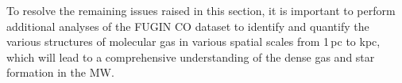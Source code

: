 \documentclass[proof]{pasj01}
\begin{document}

To resolve the remaining issues raised in this section, it is important to perform additional analyses of the FUGIN CO dataset to identify and quantify the various structures of molecular gas in various spatial scales from 1\,pc to kpc, which will lead to a comprehensive understanding of the dense gas and star formation in the MW.
\end{document}
